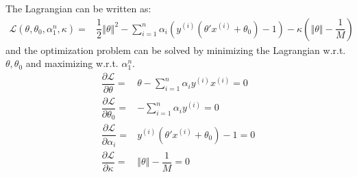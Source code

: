 \documentclass[11pt,a4paper]{ctexart}
\numberwithin{equation}{section}%
\begin{document}
The Lagrangian can be written as:
\begin{align*}
    \mathcal{L}(\theta ,\theta _0,\alpha_1^n,\kappa  )=& \dfrac{ 1 }{ 2 }\left\Vert \theta  \right\Vert ^2 - \sum_{i=1}^n \alpha _i \left( y^{(i)}(\theta 'x^{(i)} +\theta _0) -1 \right)  - \kappa \left( \left\Vert \theta  \right\Vert -\dfrac{ 1 }{ M }  \right)
\end{align*}
and the optimization problem can be solved by minimizing the Lagrangian w.r.t. $ \theta ,\theta _0 $ and maximizing w.r.t. $ \alpha_1^n $.
\begin{align*}
    \dfrac{ \partial \mathcal{L} }{ \partial \theta  }=& \theta - \sum_{i=1}^n \alpha _i y^{(i)}x^{(i)} =0\\
    \dfrac{ \partial \mathcal{L} }{ \partial \theta _0 }=& - \sum_{i=1}^n \alpha _i y^{(i)} =0\\
    \dfrac{ \partial \mathcal{L} }{ \partial \alpha _i }=& y^{(i)}(\theta 'x^{(i)} +\theta _0) -1 =0 \\
    \dfrac{ \partial \mathcal{L} }{ \partial \kappa  }=& \left\Vert \theta  \right\Vert -\dfrac{ 1 }{ M } =0
\end{align*}
\end{document}
